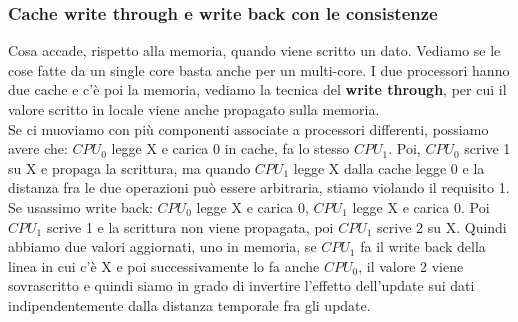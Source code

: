 \documentclass[12pt, oneside]{extbook}
\begin{document}
\subsubsection{Cache write through e write back con le consistenze}
Cosa accade, rispetto alla memoria, quando viene scritto un dato. Vediamo se le cose fatte da un single core basta anche per un multi-core. I due processori hanno due cache e c'è poi la memoria, vediamo la tecnica del \textbf{write through}, per cui il valore scritto in locale viene anche propagato sulla memoria.\\
Se ci muoviamo con più componenti associate a processori differenti, possiamo avere che: $CPU_0$ legge X e carica 0 in cache, fa lo stesso $CPU_1$. Poi, $CPU_0$ scrive 1 su X e propaga la scrittura, ma quando $CPU_1$ legge X dalla cache legge 0 e la distanza fra le due operazioni può essere arbitraria, stiamo violando il requisito 1.\\ 
Se usassimo write back: $CPU_0$ legge X e carica 0, $CPU_1$ legge X e carica 0. Poi $CPU_1$ scrive 1 e la scrittura non viene propagata, poi $CPU_1$ scrive 2 su X. Quindi abbiamo due valori aggiornati, uno in memoria, se $CPU_1$ fa il write back della linea in cui c'è X e poi successivamente lo fa anche $CPU_0$, il valore 2 viene sovrascritto e quindi siamo in grado di invertire l'effetto dell'update sui dati indipendentemente dalla distanza temporale fra gli update.
\end{document}
